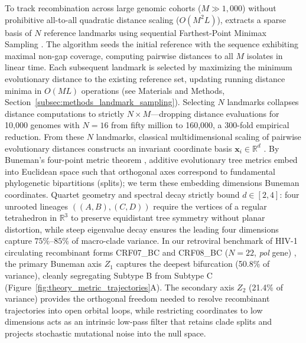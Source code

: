 To track recombination across large genomic cohorts ($M \gg 1,000$) without prohibitive all-to-all quadratic distance scaling ($O(M^2 L)$), \RhizAeon extracts a sparse basis of $N$ reference landmarks using sequential Farthest-Point Minimax Sampling \citep{gonzalez1985clustering}.
The algorithm seeds the initial reference with the sequence exhibiting maximal non-gap coverage, computing pairwise distances to all $M$ isolates in linear time.
Each subsequent landmark is selected by maximizing the minimum evolutionary distance to the existing reference set, updating running distance minima in $O(M L)$ operations (see Materials and Methods, Section~\ref{subsec:methods_landmark_sampling}).
Selecting $N$ landmarks collapses distance computations to strictly $N \times M$---dropping distance evaluations for 10,000 genomes with $N = 16$ from fifty million to 160,000, a 300-fold empirical reduction.
From these $N$ landmarks, classical multidimensional scaling of pairwise evolutionary distances constructs an invariant coordinate basis $\mathbf{x}_i \in \mathbb{R}^d$ \citep{tamura1993estimation,gower1966some}.
By Buneman's four-point metric theorem \citep{buneman1974note}, additive evolutionary tree metrics embed into Euclidean space such that orthogonal axes correspond to fundamental phylogenetic bipartitions (splits); we term these embedding dimensions Buneman coordinates.
Quartet geometry and spectral decay strictly bound $d \in [2, 4]$: four unrooted lineages $((A, B), (C, D))$ require the vertices of a regular tetrahedron in $\mathbb{R}^3$ to preserve equidistant tree symmetry without planar distortion, while steep eigenvalue decay ensures the leading four dimensions capture $75\%\text{--}85\%$ of macro-clade variance.
In our retroviral benchmark of HIV-1 circulating recombinant forms CRF07\_BC and CRF08\_BC ($N = 22$, \textit{pol} gene) \citep{su2000characterization}, the primary Buneman axis $Z_1$ captures the deepest bifurcation (50.8\% of variance), cleanly segregating Subtype B from Subtype C (Figure~\ref{fig:theory_metric_trajectories}A).
The secondary axis $Z_2$ (21.4\% of variance) provides the orthogonal freedom needed to resolve recombinant trajectories into open orbital loops, while restricting coordinates to low dimensions acts as an intrinsic low-pass filter that retains clade splits and projects stochastic mutational noise into the null space.

